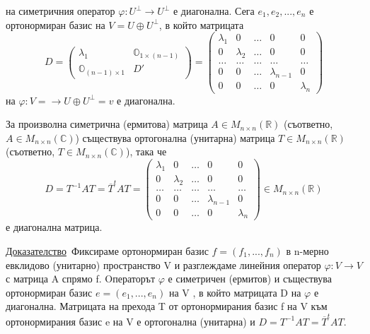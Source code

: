 \documentclass{article}
\newcommand*{\bC}{\mathbb{C}}
\newcommand*{\bR}{\mathbb{R}}
\newcommand*{\mat}[2]{M_{{#1}\times {#2}}}
\newcommand{\dok}{\underline{Доказателство}\  }
\newcommand{\tvurdenie}[2]{
    \begin{tcolorbox}[title = #1 ,colframe = blue!70!black, colback = blue!10!white]
        #2
    \end{tcolorbox}
}
\begin{document}
на симетричния оператор $\varphi : U^\perp \rightarrow U^\perp$ е диагонална.
Сега $e_1, e_2,..., e_n$ е ортонормиран базис на $V = U \oplus U^\perp$, в който матрицата
\[
    D=\left(\begin{array}{cc}
            \lambda_1                  & \mathbb{O}_{1\times(n-1)} \\
            \mathbb{O}_{(n-1)\times 1} & D'
        \end{array}
    \right)=\left(\begin{array}{ccccc}
            \lambda_1 & 0         & \dots & 0             & 0         \\
            0         & \lambda_2 & \dots & 0             & 0         \\
            \dots     & \dots     & \dots & \dots         & \dots     \\
            0         & 0         & \dots & \lambda_{n-1} & 0         \\
            0         & 0         & \dots & 0             & \lambda_n
        \end{array}\right)
\]
на $\varphi: V =  \rightarrow U \oplus U^\perp = v$ е диагонална.

\tvurdenie{Следствие 22.8}{
За произволна симетрична (ермитова) матрица $A \in \mat{n}{n}(\bR)$
(съответно, $A \in \mat{n}{n}(\bC)$) съществува ортогонална (унитарна) матрица
$T \in \mat{n}{n}(\bR)$ (съответно, $T \in \mat{n}{n}(\bC)$), така че
\[
    D=T^{-1}AT=\overline{T}^tAT=\left(\begin{array}{ccccc}
            \lambda_1 & 0         & \dots & 0             & 0         \\
            0         & \lambda_2 & \dots & 0             & 0         \\
            \dots     & \dots     & \dots & \dots         & \dots     \\
            0         & 0         & \dots & \lambda_{n-1} & 0         \\
            0         & 0         & \dots & 0             & \lambda_n
        \end{array}\right)\in \mat{n}{n}(\bR)
\]
е диагонална матрица.
}
\dok  Фиксираме ортонормиран базис $f = (f_1, . . . , f_n)$ в n-мерно евклидово (унитарно)
пространство V и разглеждаме линейния оператор $\varphi : V \rightarrow V$ с матрица A спрямо f.
Oператорът $\varphi$ е симетричен (ермитов) и съществува ортонормиран базис $e = (e_1, . . . , e_n)$
на V , в който матрицата D на $\varphi$ е диагонална. Матрицата на прехода T от
ортонормирания базис f на V към ортонормирания базис e на V е ортогонална (унитарна) и
$D = T^{-1}AT = \overline{T}^tAT$.
\end{document}

